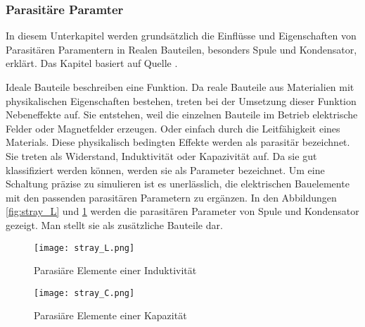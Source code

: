 \subsubsection{Parasitäre Paramter}\label{subsec:parasitparam}
In diesem Unterkapitel werden grundsätzlich die Einflüsse und Eigenschaften von Parasitären Paramentern in Realen Bauteilen, besonders Spule und Kondensator, erklärt.
Das Kapitel basiert auf Quelle \cite{aufgabenstellung}.

Ideale Bauteile beschreiben eine Funktion. Da reale Bauteile aus Materialien mit physikalischen Eigenschaften bestehen, treten bei der Umsetzung dieser Funktion Nebeneffekte auf. Sie entstehen, weil die einzelnen Bauteile im Betrieb elektrische Felder oder Magnetfelder erzeugen. Oder einfach durch die Leitfähigkeit eines Materials. Diese physikalisch bedingten Effekte werden als parasitär bezeichnet. Sie treten als Widerstand, Induktivität oder Kapazivität auf. Da sie gut klassifiziert werden können, werden sie als Parameter bezeichnet. 
Um eine Schaltung präzise zu simulieren ist es unerlässlich, die elektrischen Bauelemente mit den passenden parasitären Parametern zu ergänzen. In den Abbildungen \ref{fig:stray_L} und \ref{fig:stray_C} werden die parasitären Parameter von Spule und Kondensator gezeigt. Man stellt sie als zusätzliche Bauteile dar.


\begin{figure}[H]
	\begin{minipage}[h]{0.45\linewidth}
		\centering
		\texttt{[image: stray\_L.png]}
		\caption{Parasiäre Elemente einer Induktivität \cite{aufgabenstellung}}
		\label{fig:stray_L}
	\end{minipage}	
	\begin{minipage}[h]{0.45\linewidth}
		\centering
		\texttt{[image: stray\_C.png]}
		\caption{Parasiäre Elemente einer Kapazität \cite{aufgabenstellung}}
		\label{fig:stray_C}
	\end{minipage}
\end{figure}

\bigskip
